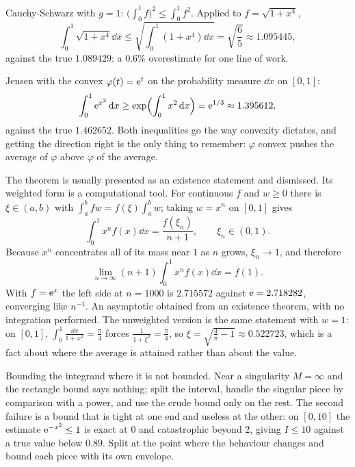 \begin{worked}
Cauchy-Schwarz with $g=1$: $\bigl(\int_0^{1}f\bigr)^{2}\leq\int_0^{1}f^{2}$. Applied to $f=\sqrt{1+x^{4}}$,
\[\int_0^{1}\sqrt{1+x^{4}}\dd x\leq\sqrt{\int_0^{1}(1+x^{4})\dd x}=\sqrt{\frac65}\approx1.095445,\]
against the true $1.089429$: a $0.6\%$ overestimate for one line of work.

Jensen with the convex $\varphi(t)=\mathrm{e}^{t}$ on the probability measure $\dd x$ on $[0,1]$:
\[\int_0^{1}\mathrm{e}^{x^{2}}\,\mathrm{d} x\geq\exp\Bigl(\int_0^{1}x^{2}\,\mathrm{d} x\Bigr)=\mathrm{e}^{1/3}\approx1.395612,\]
against the true $1.462652$. Both inequalities go the way convexity dictates, and getting the direction right is the only thing to remember: $\varphi$ convex pushes the average of $\varphi$ above $\varphi$ of the average.
\end{worked}

\begin{worked}
The theorem is usually presented as an existence statement and dismissed. Its weighted form is a computational tool. For continuous $f$ and $w\geq0$ there is $\xi\in(a,b)$ with $\int_a^bfw=f(\xi)\int_a^bw$; taking $w=x^{n}$ on $[0,1]$ gives
\[\int_0^{1}x^{n}f(x)\dd x=\frac{f(\xi_{n})}{n+1},\qquad \xi_{n}\in(0,1).\]
Because $x^{n}$ concentrates all of its mass near $1$ as $n$ grows, $\xi_{n}\to1$, and therefore
\[\lim_{n\to\infty}(n+1)\int_0^{1}x^{n}f(x)\dd x=f(1).\]
With $f=\mathrm{e}^{x}$ the left side at $n=1000$ is $2.715572$ against $\mathrm{e}=2.718282$, converging like $n^{-1}$. An asymptotic obtained from an existence theorem, with no integration performed. The unweighted version is the same statement with $w=1$: on $[0,1]$, $\int_0^{1}\tfrac{\dd x}{1+x^{2}}=\tfrac{\pi}{4}$ forces $\tfrac{1}{1+\xi^{2}}=\tfrac{\pi}{4}$, so $\xi=\sqrt{\tfrac{4}{\pi}-1}\approx0.522723$, which is a fact about where the average is attained rather than about the value.
\end{worked}

\begin{trap}
Bounding the integrand where it is not bounded. Near a singularity $M=\infty$ and the rectangle bound says nothing; split the interval, handle the singular piece by comparison with a power, and use the crude bound only on the rest. The second failure is a bound that is tight at one end and useless at the other: on $[0,10]$ the estimate $\mathrm{e}^{-x^{2}}\leq1$ is exact at $0$ and catastrophic beyond $2$, giving $I\leq10$ against a true value below $0.89$. Split at the point where the behaviour changes and bound each piece with its own envelope.
\end{trap}


